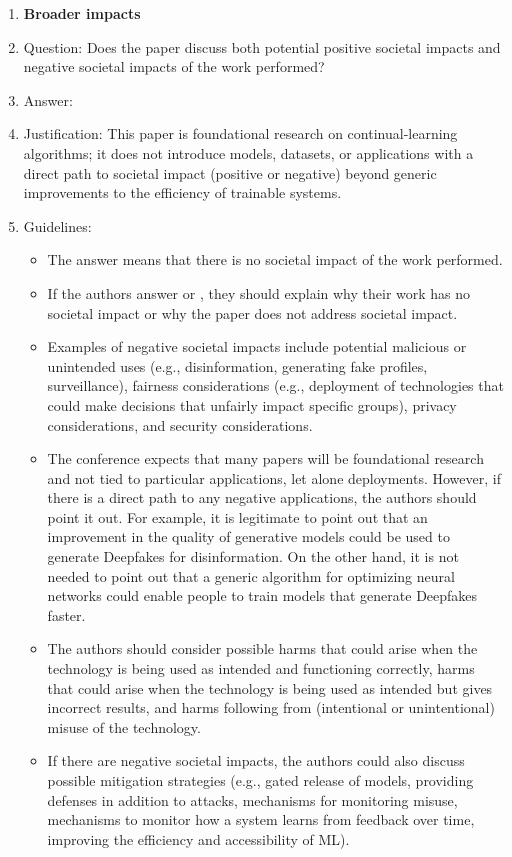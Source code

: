 \begin{enumerate}
\item {\bf Broader impacts}
    \item[] Question: Does the paper discuss both potential positive societal impacts and negative societal impacts of the work performed?
    \item[] Answer: \answerNA{}
    \item[] Justification: This paper is foundational research on continual-learning algorithms; it does not introduce models, datasets, or applications with a direct path to societal impact (positive or negative) beyond generic improvements to the efficiency of trainable systems.
    \item[] Guidelines:
    \begin{itemize}
        \item The answer \answerNA{} means that there is no societal impact of the work performed.
        \item If the authors answer \answerNA{} or \answerNo, they should explain why their work has no societal impact or why the paper does not address societal impact.
        \item Examples of negative societal impacts include potential malicious or unintended uses (e.g., disinformation, generating fake profiles, surveillance), fairness considerations (e.g., deployment of technologies that could make decisions that unfairly impact specific groups), privacy considerations, and security considerations.
        \item The conference expects that many papers will be foundational research and not tied to particular applications, let alone deployments. However, if there is a direct path to any negative applications, the authors should point it out. For example, it is legitimate to point out that an improvement in the quality of generative models could be used to generate Deepfakes for disinformation. On the other hand, it is not needed to point out that a generic algorithm for optimizing neural networks could enable people to train models that generate Deepfakes faster.
        \item The authors should consider possible harms that could arise when the technology is being used as intended and functioning correctly, harms that could arise when the technology is being used as intended but gives incorrect results, and harms following from (intentional or unintentional) misuse of the technology.
        \item If there are negative societal impacts, the authors could also discuss possible mitigation strategies (e.g., gated release of models, providing defenses in addition to attacks, mechanisms for monitoring misuse, mechanisms to monitor how a system learns from feedback over time, improving the efficiency and accessibility of ML).
    \end{itemize}


\end{enumerate}

